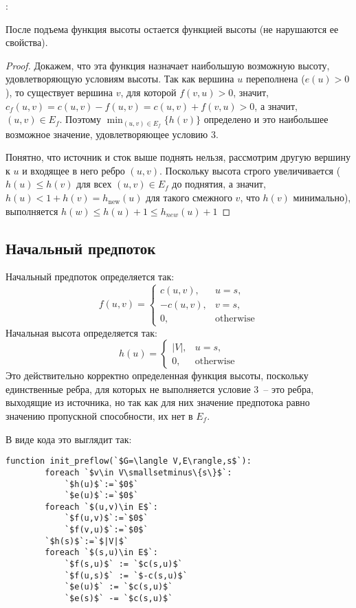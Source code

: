 \begin{algorithm}
:\\
\end{algorithm}
\begin{lemma}
	После подъема функция высоты остается функцией высоты (не нарушаются ее свойства).
\end{lemma}
\begin{proof}
	Докажем, что эта функция назначает наибольшую возможную высоту, удовлетворяющую условиям высоты. Так как вершина $u$ переполнена ($e(u)>0$), то существует вершина $v$, для которой $f(v,u)>0$, значит, $c_f(u,v)=c(u,v)-f(u,v)=c(u,v)+f(v,u)>0$, а значит, $(u,v)\in E_f$. Поэтому $\min_{(u,v)\in E_f}\{h(v)\}$ определено и это наибольшее возможное значение, удовлетворяющее условию 3.
	
	Понятно, что источник и сток выше поднять нельзя, рассмотрим другую вершину к $u$ и входящее в него ребро $(u,v)$. Поскольку высота строго увеличивается ($h(u)\le h(v)$ для всех $(u,v)\in E_f$ до поднятия, а значит, $h(u)<1+h(v)=h_\mathrm{new}(u)$ для такого смежного $v$, что $h(v)$ минимально), выполняется $h(w)\le h(u)+1\le h_{new}(u)+1$
\end{proof}

\subsection{Начальный предпоток}
Начальный предпоток определяется так:
$$
f(u,v)=\begin{cases}
	c(u,v), & u=s,\\
	-c(u,v), & v=s,\\
	0, & \mathrm{otherwise}
\end{cases}
$$
Начальная высота определяется так:
$$
h(u)=\begin{cases}
|V|, & u=s,\\
0, & \mathrm{otherwise}
\end{cases}
$$
Это действительно корректно определенная функция высоты, поскольку единственные ребра, для которых не выполняется условие 3~-- это ребра, выходящие из источника, но так как для них значение предпотока равно значению пропускной способности, их нет в $E_f$.

В виде кода это выглядит так: %
\begin{lstlisting}[escapeinside=``]
	function init_preflow(`$G=\langle V,E\rangle,s$`):
		foreach `$v\in V\smallsetminus\{s\}$`:
			`$h(u)$`:=`$0$`
			`$e(u)$`:=`$0$`
		foreach `$(u,v)\in E$`:
			`$f(u,v)$`:=`$0$`
			`$f(v,u)$`:=`$0$`
		`$h(s)$`:=`$|V|$`
		foreach `$(s,u)\in E$`:
			`$f(s,u)$` := `$c(s,u)$`
			`$f(u,s)$` := `$-c(s,u)$`
			`$e(u)$` := `$c(s,u)$`
			`$e(s)$` -= `$c(s,u)$`
\end{lstlisting}



